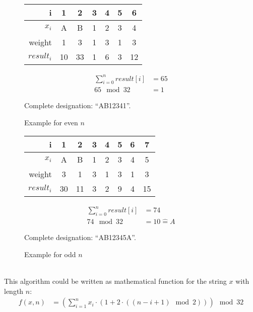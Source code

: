 \begin{minipage}[t]{.45\textwidth}
	\begin{figure}[H]
		\centering

		\begin{tabular}{r|c|c|c|c|c|c}
			i          & 1  & 2  & 3 & 4 & 5 & 6 \\
			\hline
			$x_i$      & A  & B  & 1 & 2 & 3 & 4 \\
			weight     & 1  & 3  & 1 & 3 & 1 & 3 \\
			\hline
			$result_i$ & 10 & 33 & 1 & 6 & 3 & 12 \\
		\end{tabular}

		\begin{align*}
			\sum_{i=0}^{n} result[i] &= 65 \\
			65 \mod 32 &= 1
		\end{align*}

		Complete designation: ``AB12341''.

		\caption{Example for even $n$}
	\end{figure}
\end{minipage}
\hfill
\begin{minipage}[t]{.45\textwidth}
	\begin{figure}[H]
		\centering

		\begin{tabular}{r|c|c|c|c|c|c|c}
			i          & 1  & 2  & 3 & 4 & 5 & 6 & 7 \\
			\hline
			$x_i$      & A  & B  & 1 & 2 & 3 & 4 & 5 \\
			weight     & 3  & 1  & 3 & 1 & 3 & 1 & 3 \\
			\hline
			$result_i$ & 30 & 11 & 3 & 2 & 9 & 4 & 15 \\
		\end{tabular}

		\begin{align*}
			\sum_{i=0}^{n} result[i] &= 74 \\
			74 \mod 32 &= 10 \hat{=} A
		\end{align*}

		Complete designation: ``AB12345A''.

		\caption{Example for odd $n$}
	\end{figure}
\end{minipage} \\


This algorithm could be written as mathematical function for the string $x$ with
length $n$:
\begin{align*}
	f(x, n) &= \left(\sum_{i=1}^{n} x_i \cdot \left(1 + 2 \cdot \left( \left(
		n - i + 1 \right) \mod 2 \right) \right) \right) \mod 32
\end{align*}
